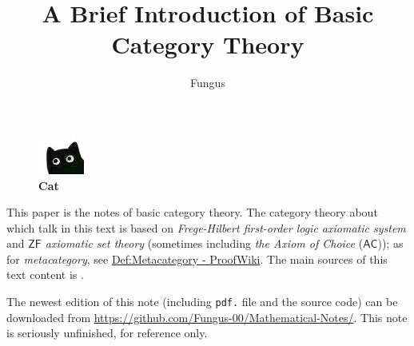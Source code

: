 \documentclass{article}
\title{A Brief Introduction of Basic Category Theory}	%
\author{Fungus}	%
\begin{document}
\maketitle
\renewcommand{\thefootnote}{\color{red}{*}}
\theoremstyle{definition}
\newtheorem{defi}{Definition}
\newtheorem{thm}{Theorem}
\newtheorem{lmm}{Lemma}
\newtheorem{exm}{Example}
\newtheorem{cor}{Corollary}
\newtheorem*{Mark}{Mark}

\newcommand\Ob{\mathrm{Ob}}
\newcommand\Mor{\mathrm{Mor}}
\newcommand\Hom{\mathrm{Hom}}
\newcommand\dom{\mathrm{dom}}
\newcommand\cod{\mathrm{cod}}
\newcommand\id{\mathrm{id}}
\newcommand\op{^\mathrm{op}}
\newcommand\zfc{\mathsf{ZFC}}
\newcommand\AC{\mathsf{AC}}
\newcommand\con{\mathrm{Con}}
\newcommand\tid{\mathbf{id}}
\newcommand\ca{\mathcal{C}}
\newcommand\D{\mathcal{D}}
\newcommand\1{\mathit{1}}
\newcommand\iv{^{-1}}
\newcommand\tto{\mathop{\to}\limits^{\sim}}
\newcommand\equ{\mathop{\Rightarrow}\limits^{\sim}}
\newcommand\ev{\mathrm{ev}}
\newcommand\fct{\mathrm{Fct}}

\nocite{alg-2}\nocite{cat-3}\nocite{cat-4}\nocite{cat-5}\nocite{cat-6-1}\nocite{cat-7}\nocite{cat-8}\nocite{cat-9}\nocite{cat-10}\nocite{cat-11}\nocite{Tex-1}

\begin{figure}[ht] %
	\centering
	\includegraphics{Cat.jpg}	%
	\caption*{\bf Cat}
	\label{Cat}
\end{figure}

This paper is the notes of basic category theory. The category theory about which talk in this text is based on \emph{Frege-Hilbert first-order logic axiomatic system} and \emph{$\mathsf{ZF}$ axiomatic set theory} (sometimes including \emph{the Axiom of Choice} ($\AC$)); as for \emph{metacategory}, see \href{https://proofwiki.org/wiki/Definition:Metacategory}{Def:Metacategory - ProofWiki}. The main sources of this text content is \cite[第二章]{alg-1}.

The newest edition of this note (including \texttt{pdf.} file and the source code) can be downloaded from \url{https://github.com/Fungus-00/Mathematical-Notes/}. This note is seriously unfinished, for reference only.
\end{document}

